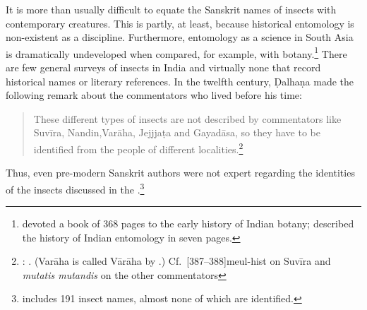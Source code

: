 It is more than usually difficult to equate the Sanskrit names of
insects with contemporary creatures.  This is partly, at least,
because historical entomology is non-existent as a discipline.
Furthermore, entomology as a science in South Asia is dramatically
undeveloped when compared, for example, with
botany.\footnote{\citet{desm-1992} devoted a book of 368 pages to the
    early history of Indian botany; \citet[338--345]{dove-1922} described
    the history of Indian entomology in seven pages.}  There are few
    general surveys of insects in India and virtually none that record
    historical names or literary references.  In the twelfth century,
    Ḍalhaṇa made the following remark about the commentators who lived
    before his time:
\begin{quote}
These different types of insects are not described by commentators
like Suvīra, Nandin,Varāha, Jejjjaṭa and Gayadāsa, so they have to be
identified from the people of different
localities.\footnote{: .
    (Varāha is called Vārāha by .) Cf.\
    [387--388]{meul-hist} on Suvīra and \emph{mutatis
mutandis} on
    the other commentators}
\end{quote}
Thus, even pre-modern Sanskrit authors were not expert regarding the
identities of the insects discussed in the
\SS.\footnote{\cite{moni-sans} includes 191 insect names, almost
    none of which are identified.} 

